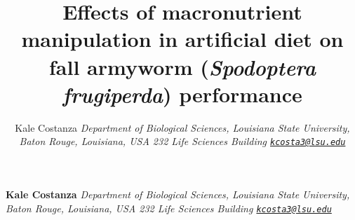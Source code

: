 \documentclass[12pt,]{article}
\title{Effects of macronutrient manipulation in artificial diet on fall
armyworm (\emph{Spodoptera frugiperda}) performance  }
\author{\Large Kale
Costanza\vspace{0.05in} \newline\normalsize\emph{Department of
Biological Sciences, Louisiana State University, Baton Rouge, Louisiana,
USA \textbar{} 232 Life Sciences Building \textbar{}
\href{mailto:kcosta3@lsu.edu}{\nolinkurl{kcosta3@lsu.edu}}}  }
\date{}
\newcommand*{\authorfont}{\fontfamily{phv}\selectfont}
\begin{document}
	
%    


{%
\setlength{\parindent}{0pt}
\thispagestyle{plain}
{\fontsize{18}{20}\selectfont\raggedright 
\maketitle  %

}

{
   \vskip 13.5pt\relax \normalsize\fontsize{11}{12} 
\textbf{\authorfont Kale Costanza} \hskip 15pt \emph{\small Department
of Biological Sciences, Louisiana State University, Baton Rouge,
Louisiana, USA \textbar{} 232 Life Sciences Building \textbar{}
\href{mailto:kcosta3@lsu.edu}{\nolinkurl{kcosta3@lsu.edu}}}   

}

}
\end{document}
